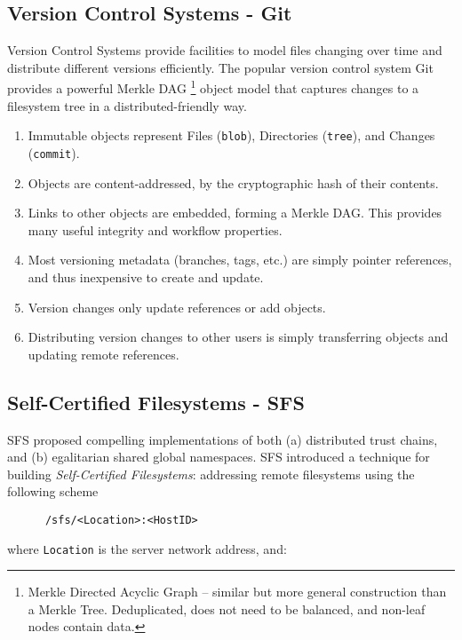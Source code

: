 \documentclass{sig-alternate}
\begin{document}
\subsection{Version Control Systems - Git}

Version Control Systems provide facilities to model files changing over time and distribute different versions efficiently. The popular version control system Git provides a powerful Merkle DAG \footnote{Merkle Directed Acyclic Graph -- similar but more general construction than a Merkle Tree. Deduplicated, does not need to be balanced, and non-leaf nodes contain data.} object model that captures changes to a filesystem tree in a distributed-friendly way.

\begin{enumerate}
  \item Immutable objects represent Files (\texttt{blob}), Directories (\texttt{tree}), and Changes (\texttt{commit}).
  \item Objects are content-addressed, by the cryptographic hash of their contents.
  \item Links to other objects are embedded, forming a Merkle DAG. This
  provides many useful integrity and workflow properties.
  \item Most versioning metadata (branches, tags, etc.) are simply pointer references, and thus inexpensive to create and update.
  \item Version changes only update references or add objects.
  \item Distributing version changes to other users is simply transferring objects and updating remote references.
\end{enumerate}

\subsection{Self-Certified Filesystems - SFS}

SFS \cite{SFS} proposed compelling implementations of both (a) distributed trust chains, and (b) egalitarian shared global namespaces. SFS introduced a technique for building \textit{Self-Certified Filesystems}: addressing remote filesystems using the following scheme

\begin{verbatim}
      /sfs/<Location>:<HostID>
\end{verbatim}

\noindent where \texttt{Location} is the server network address, and:
\end{document}
